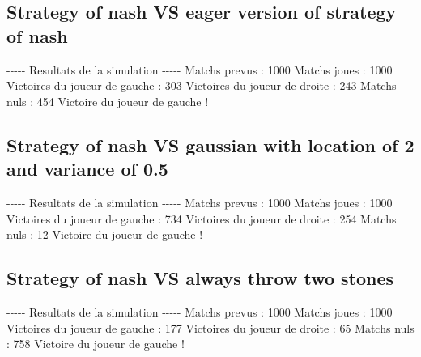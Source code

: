 \documentclass{article}%
\begin{document}
%
\subsection{Strategy of nash VS eager version of strategy of nash}%
\label{subsec:Strategy of nash VS eager version of strategy of nash}%
{-}{-}{-}{-}{-} Resultats de la simulation {-}{-}{-}{-}{-}\newline%
		\newline%
Matchs prevus : 1000\newline%
Matchs joues : 1000\newline%
\newline%
Victoires du joueur de gauche : 303\newline%
Victoires du joueur de droite : 243\newline%
Matchs nuls : 454\newline%
\newline%
Victoire du joueur de gauche !

%
\subsection{Strategy of nash VS gaussian with location of 2 and variance of 0.5}%
\label{subsec:Strategy of nash VS gaussian with location of 2 and variance of 0.5}%
{-}{-}{-}{-}{-} Resultats de la simulation {-}{-}{-}{-}{-}\newline%
		\newline%
Matchs prevus : 1000\newline%
Matchs joues : 1000\newline%
\newline%
Victoires du joueur de gauche : 734\newline%
Victoires du joueur de droite : 254\newline%
Matchs nuls : 12\newline%
\newline%
Victoire du joueur de gauche !

%
\subsection{Strategy of nash VS always throw two stones}%
\label{subsec:Strategy of nash VS always throw two stones}%
{-}{-}{-}{-}{-} Resultats de la simulation {-}{-}{-}{-}{-}\newline%
		\newline%
Matchs prevus : 1000\newline%
Matchs joues : 1000\newline%
\newline%
Victoires du joueur de gauche : 177\newline%
Victoires du joueur de droite : 65\newline%
Matchs nuls : 758\newline%
\newline%
Victoire du joueur de gauche !
\end{document}
